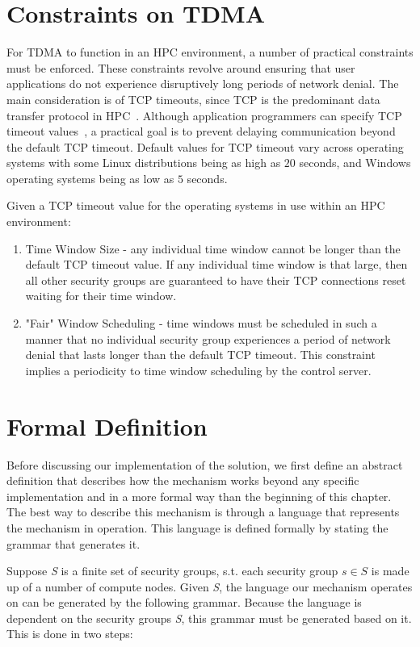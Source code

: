 \documentclass[oneside,12pt]{memoir}
\begin{document}
\section{Constraints on TDMA}
\label{sec:constraints}
For TDMA to function in an HPC environment, a number of practical constraints must be enforced. These constraints revolve around ensuring that user applications do not experience disruptively long periods of network denial. The main consideration is of TCP timeouts, since TCP is the predominant data transfer protocol in HPC~\cite{allcock2002data}. Although application programmers can specify TCP timeout values~\cite{eggert2009tcp}, a practical goal is to prevent delaying communication beyond the default TCP timeout. Default values for TCP timeout vary across operating systems with some Linux distributions being as high as $20$ seconds, and Windows operating systems being as low as $5$ seconds.

Given a TCP timeout value for the operating systems in use within an HPC environment:
\begin{enumerate} \itemsep1pt \parskip0pt 
\item Time Window Size - any individual time window cannot be longer than the default TCP timeout value. If any individual time window is that large, then all other security groups are guaranteed to have their TCP connections reset waiting for their time window.
\item "Fair" Window Scheduling - time windows must be scheduled in such a manner that no individual security group experiences a period of network denial that lasts longer than the default TCP timeout. This constraint implies a periodicity to time window scheduling by the control server.
\end{enumerate}
\section{Formal Definition}
\label{sec:formal_definition}
Before discussing our implementation of the solution, we first define an abstract definition that describes how the mechanism works beyond any specific implementation and in a more formal way than the beginning of this chapter. The best way to describe this mechanism is through a language that represents the mechanism in operation. This language is defined formally by stating the grammar that generates it.

Suppose \emph{S} is a finite set of security groups, s.t. each security group $s\in S$ is made up of a number of compute nodes. Given \emph{S}, the language our mechanism operates on can be generated by the following grammar. Because the language is dependent on the security groups \emph{S}, this grammar must be generated based on it. This is done in two steps:
\end{document}
